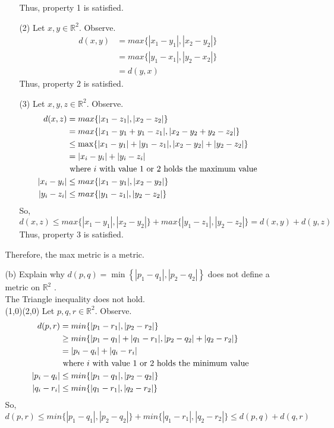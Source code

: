 \documentclass[12pt]{article}
\newcommand{\R}{\mathbb{R}}
\begin{document}
\begin{enumerate}
\begin{enumerate}
\begin{enumerate}
				Thus, property 1 is satisfied.
				\item[(2)] Let $ x,y\in \R^2 $. Observe.
				\begin{align*}
				d(x,y) &= max\{|x_1-y_1|,|x_2-y_2|\}\\
				&= max\{|y_1-x_1|,|y_2-x_2|\}\\
				&= d(y,x)
				\end{align*}
				Thus, property 2 is satisfied.
				\item[(3)] Let $ x,y,z \in \R^2 $. Observe.
				\begin{align*}
				d(x,z)  &= max\{|x_1-z_1|,|x_2-z_2|\}\\
				&= max\{|x_1-y_1+y_1-z_1|,|x_2-y_2+y_2-z_2|\}\\
				&\leq \max\{|x_1-y_1|+|y_1-z_1|,|x_2-y_2|+|y_2-z_2|\}\\
				&= |x_i-y_i|+|y_i-z_i| \\
				&\text{ where $ i $ with value 1 or 2 holds the maximum value}\\
				|x_i-y_i|&\leq max\{|x_1-y_1|,|x_2-y_2|\}\\
				|y_i-z_i|&\leq max\{|y_1-z_1|,|y_2-z_2|\}
				\end{align*}
				So, 
				\[d(x,z) \leq max\{|x_1-y_1|,|x_2-y_2|\} + max\{|y_1-z_1|,|y_2-z_2|\}=d(x,y)+d(y,z)\]
				Thus, property 3 is satisfied.
			\end{enumerate}	
			Therefore, the max metric is a metric.
			\item[(b)] Explain why $d ( p , q ) = \min \left\{ \left| p _ { 1 } - q _ { 1 } \right| , \left| p _ { 2 } - q _ { 2 } \right| \right\}$ does not define a metric on $\mathbb { R } ^ { 2 }$ .\\
			The Triangle inequality does not hold.\\ (1,0)(2,0)
			Let $ p,q,r \in \R^2 $. Observe.
			\begin{align*}
			d(p,r) &= min\{|p_1-r_1|,|p_2-r_2|\}\\
			&\geq min\{|p_1-q_1|+|q_1-r_1|,|p_2-q_2|+|q_2-r_2|\}\\
			&= |p_i-q_i|+|q_i-r_i|\\
			&\text{ where $ i $ with value 1 or 2 holds the minimum value}\\
			|p_i-q_i| &\leq min\{|p_1-q_1|,|p_2-q_2|\}\\
			|q_i-r_i| &\leq min\{|q_1-r_1|,|q_2-r_2|\}
			\end{align*}
			So, 
			\[d(p,r) \leq min\{|p_1-q_1|,|p_2-q_2|\} + min\{|q_1-r_1|,|q_2-r_2|\}\leq d(p,q)+d(q,r)\]
		\end{enumerate}

\end{enumerate}
\end{document}
